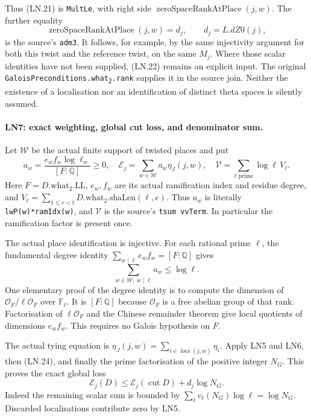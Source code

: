 Thus (LN.21) is \texttt{MultLe}, with right side
$\operatorname{zeroSpaceRankAtPlace}(j,w)$.  The further equality
\[
 \operatorname{zeroSpaceRankAtPlace}(j,w)=d_j,
              \qquad d_j=L.dZ0(j),                     \tag{LN.22}
\]
is the source's \texttt{adm3}.  It follows, for example, by the same
injectivity argument for both this twist and the reference twist,
on the same $M_j$.  Where those scalar identities have not been
supplied, (LN.22) remains an explicit input.  The original
\texttt{GaloisPreconditions.what\textsubscript{2}.rank} supplies it
in the source join.  Neither the existence of a localisation nor
an identification of distinct theta spaces is silently assumed.

\paragraph{LN7: exact weighting, global cut loss, and denominator sum.}
\label{claim:LN7}
Let $\mathcal W$ be the actual finite support of twisted places and
put
\[
 a_w=\frac{e_wf_w\log\ell_w}{[F:\mathbb Q]}\ge0,
 \quad \mathcal E_j=\sum_{w\in\mathcal W}a_w\eta_J(j,w),
 \quad \mathcal V=\sum_{\ell\text{ prime}}\log\ell\,V_\ell.
 \tag{LN.23}
\]
Here $F=D.\mathrm{what}_2.\mathrm{LL}$, $e_w,f_w$ are its actual
ramification index and residue degree, and
$V_\ell=\sum_{1\le e<t}D.\mathrm{what}_2.\mathrm{shaLen}(\ell,e)$.
Thus $a_w$ is literally \texttt{lwP(w)*ramIdx(w)}, and
$\mathcal V$ is the source's \texttt{tsum vvTerm}.  In particular
the ramification factor is present once.

The actual place identification is injective.  For each rational
prime $\ell$, the fundamental degree identity
$\sum_{w\mid\ell}e_wf_w=[F:\mathbb Q]$ gives
\[
              \sum_{w\in\mathcal W,\ w\mid\ell}a_w\le\log\ell.
 \tag{LN.24}
\]
One elementary proof of the degree identity is to compute the
dimension of $\mathcal O_F/\ell\mathcal O_F$ over $\mathbb F_\ell$.
It is $[F:\mathbb Q]$ because $\mathcal O_F$ is a free abelian group
of that rank.  Factorisation of $\ell\mathcal O_F$ and the Chinese
remainder theorem give local quotients of dimensions $e_wf_w$.
This requires no Galois hypothesis on $F$.

The actual tying equation is
$\eta_J(j,w)=\sum_{i\in\operatorname{locs}(j,w)}\eta_i$.
Apply LN5 and LN6, then (LN.24), and finally the prime factorisation
of the positive integer $N_G$.  This proves the exact global loss
\[
 \boxed{\quad\mathcal E_j(D)\le
             \mathcal E_j(\operatorname{cut}D)+d_j\log N_G.\quad}
 \tag{LN.25}
\]
Indeed the remaining scalar sum is bounded by
$\sum_\ell v_\ell(N_G)\log\ell=\log N_G$.  Discarded
localisations contribute zero by LN5.

